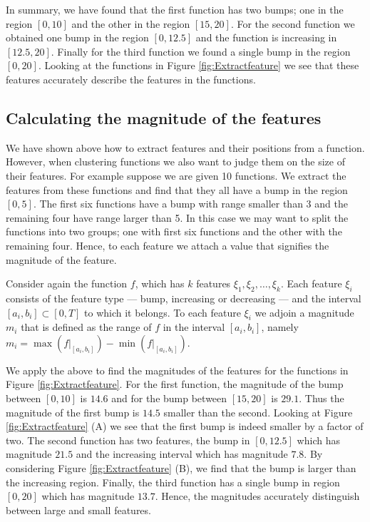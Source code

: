\documentclass[../main.tex]{subfiles}
\begin{document}
  In summary, we have found that the first function has two bumps; one in the region $[0,10]$ and the other in the region $[15,20]$. For the second function we obtained one bump in the region $[0,12.5]$ and the function is increasing in $[12.5,20]$. Finally for the third function we found a single bump in the region $[0,20]$. Looking at the functions in Figure \ref{fig:Extractfeature} we see that these features accurately describe the features in the functions. 
  
    
\subsection{Calculating the magnitude of the features}
We have shown above how to extract features and their positions from a function. However, when clustering functions we also want to judge them on the size of their features. For example suppose we are given 10 functions. We extract the features from these functions and find that they all have a bump in the region $[0,5]$. The first six functions have a bump with range smaller than 3 and the remaining four have range larger than 5. In this case we may want to split the functions into two groups; one with first six functions and the other with the remaining four. Hence, to each feature we attach a value that signifies the magnitude of the feature. 

 Consider again the function $f$, which has $k$ features $\xi_1, \xi_2,\dots, \xi_k$. Each feature $\xi_i$ consists of the feature type --- bump, increasing or decreasing --- and the interval $[a_i,b_i] \subset [0,T]$ to which it belongs. To each feature $\xi_i$ we adjoin a magnitude $m_i$ that is defined as the range of $f$ in the interval $[a_i,b_i]$, namely $m_i = \max (f|_{[a_i,b_i]}) - \min (f|_{[a_i,b_i]})$. 
 
 We apply the above to find the magnitudes of the features for the functions in  Figure \ref{fig:Extractfeature}. For the first function, the magnitude of the bump between $[0,10]$ is $14.6$ and for the bump between $[15,20]$ is $29.1$.  Thus the magnitude of the first bump is $14.5$ smaller than the second. Looking at Figure \ref{fig:Extractfeature} (A) we see that the first bump is indeed smaller by a factor of two. The second function has two features, the bump in $[0,12.5]$ which has magnitude $21.5$ and the increasing interval which has magnitude $7.8$. By considering Figure \ref{fig:Extractfeature} (B), we find that the bump is larger than the increasing region. Finally, the third function has a single bump in region $[0,20]$ which has magnitude $13.7$. Hence, the magnitudes accurately distinguish between large and small features. 
\end{document}
